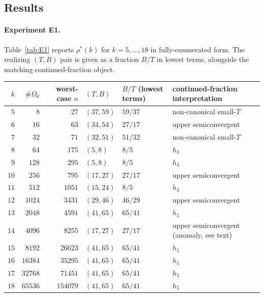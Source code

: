 \documentclass[11pt,a4paper]{article}
\theoremstyle{definition}
\theoremstyle{remark}
\begin{document}
\subsection{Results}

\paragraph{Experiment E1.}
Table~\ref{tab:E1} reports $\rho^{*}(k)$ for $k = 5, \ldots, 18$ in
fully-enumerated form.  The realizing $(T, B)$ pair is given as a
fraction $B/T$ in lowest terms, alongside the matching
continued-fraction object.

\begin{table}[htbp]
\centering
\renewcommand{\arraystretch}{1.15}
\begin{tabular}{r r r l l l}
\toprule
$k$ & $\#\Omega_k$ & worst-case $n$ & $(T,B)$ & $B/T$ (lowest terms)
  & continued-fraction interpretation \\
\midrule
$5$  & $8$        & $27$       & $(37,59)$  & $59/37$  & non-canonical small-$T$ \\
$6$  & $16$       & $63$       & $(34,54)$  & $27/17$  & upper semiconvergent \\
$7$  & $32$       & $71$       & $(32,51)$  & $51/32$  & non-canonical small-$T$ \\
$8$  & $64$       & $175$      & $(5,8)$    & $8/5$    & $h_3$ \\
$9$  & $128$      & $295$      & $(5,8)$    & $8/5$    & $h_3$ \\
$10$ & $256$      & $795$      & $(17,27)$  & $27/17$  & upper semiconvergent \\
$11$ & $512$      & $1051$     & $(15,24)$  & $8/5$    & $h_3$ \\
$12$ & $1024$     & $3431$     & $(29,46)$  & $46/29$  & upper semiconvergent \\
$13$ & $2048$     & $4591$     & $(41,65)$  & $65/41$  & $h_5$ \\
$14$ & $4096$     & $8255$     & $(17,27)$  & $27/17$  & upper semiconvergent (anomaly, see text) \\
$15$ & $8192$     & $26623$    & $(41,65)$  & $65/41$  & $h_5$ \\
$16$ & $16384$    & $35295$    & $(41,65)$  & $65/41$  & $h_5$ \\
$17$ & $32768$    & $71451$    & $(41,65)$  & $65/41$  & $h_5$ \\
$18$ & $65536$    & $154079$   & $(41,65)$  & $65/41$  & $h_5$ \\

\end{tabular}
\end{table}
\end{document}
